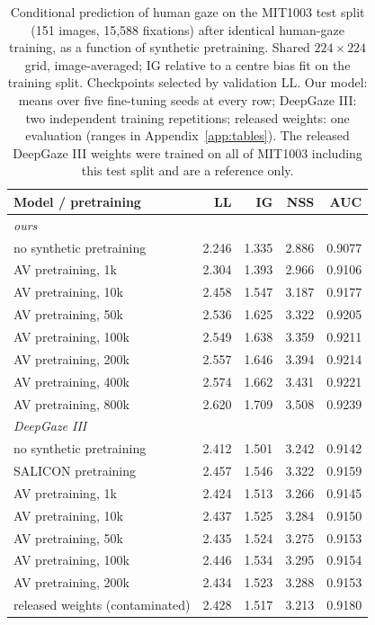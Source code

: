 \begin{table}[t]
  \centering
  \small
  \begin{tabular}{lrrrr}
    \toprule
    Model / pretraining & LL & IG & NSS & AUC \\
    \midrule
    \multicolumn{5}{l}{\emph{ours}} \\
    no synthetic pretraining & 2.246 & 1.335 & 2.886 & 0.9077 \\
    AV pretraining, 1k & 2.304 & 1.393 & 2.966 & 0.9106 \\
    AV pretraining, 10k & 2.458 & 1.547 & 3.187 & 0.9177 \\
    AV pretraining, 50k & 2.536 & 1.625 & 3.322 & 0.9205 \\
    AV pretraining, 100k & 2.549 & 1.638 & 3.359 & 0.9211 \\
    AV pretraining, 200k & 2.557 & 1.646 & 3.394 & 0.9214 \\
    AV pretraining, 400k & 2.574 & 1.662 & 3.431 & 0.9221 \\
    AV pretraining, 800k & 2.620 & 1.709 & 3.508 & 0.9239 \\
    \midrule
    \multicolumn{5}{l}{\emph{DeepGaze III}} \\
    no synthetic pretraining & 2.412 & 1.501 & 3.242 & 0.9142 \\
    SALICON pretraining & 2.457 & 1.546 & 3.322 & 0.9159 \\
    AV pretraining, 1k & 2.424 & 1.513 & 3.266 & 0.9145 \\
    AV pretraining, 10k & 2.437 & 1.525 & 3.284 & 0.9150 \\
    AV pretraining, 50k & 2.435 & 1.524 & 3.275 & 0.9153 \\
    AV pretraining, 100k & 2.446 & 1.534 & 3.295 & 0.9154 \\
    AV pretraining, 200k & 2.434 & 1.523 & 3.288 & 0.9153 \\
    \midrule
    released weights (contaminated) & 2.428 & 1.517 & 3.213 & 0.9180 \\
    \bottomrule
  \end{tabular}
  \caption{Conditional prediction of human gaze on the MIT1003 test split (151 images, 15,588 fixations) after identical human-gaze training, as a function of synthetic pretraining. Shared $224\times224$ grid, image-averaged; IG relative to a centre bias fit on the training split. Checkpoints selected by validation LL. Our model: means over five fine-tuning seeds at every row; DeepGaze III: two independent training repetitions; released weights: one evaluation (ranges in Appendix~\ref{app:tables}). The released DeepGaze III weights were trained on all of MIT1003 including this test split and are a reference only.}
  \label{tab:transfer}
\end{table}

